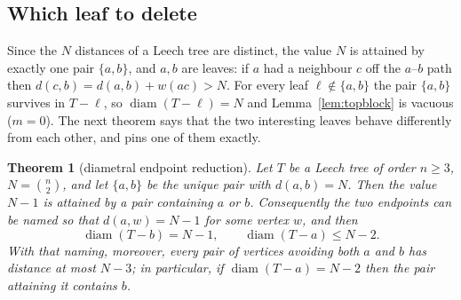 \documentclass[11pt,a4paper]{article}
\theoremstyle{plain}
\newtheorem{theorem}{Theorem}[section]
\theoremstyle{remark}
\newcommand{\bin}[2]{\binom{#1}{#2}}
\newcommand{\diam}{\operatorname{diam}}
\begin{document}
\subsection{Which leaf to delete}\label{sec:endpoint}

Since the $N$ distances of a Leech tree are distinct, the value $N$ is attained
by exactly one pair $\{a,b\}$, and $a,b$ are leaves: if $a$ had a neighbour $c$
off the $a$--$b$ path then $d(c,b)=d(a,b)+w(ac)>N$.  For every leaf
$\ell\notin\{a,b\}$ the pair $\{a,b\}$ survives in $T-\ell$, so
$\diam(T-\ell)=N$ and Lemma~\ref{lem:topblock} is vacuous ($m=0$).  The next
theorem says that the two interesting leaves behave differently from each other,
and pins one of them exactly.

\begin{theorem}[diametral endpoint reduction]\label{thm:endpoint}
Let $T$ be a Leech tree of order $n\ge3$, $N=\bin n2$, and let $\{a,b\}$ be the
unique pair with $d(a,b)=N$.  Then the value $N-1$ is attained by a pair
containing $a$ or $b$.  Consequently the two endpoints can be named so that
$d(a,w)=N-1$ for some vertex $w$, and then
\[
  \diam(T-b)=N-1,\qquad \diam(T-a)\le N-2 .
\]
With that naming, moreover, every pair of vertices avoiding both $a$ and $b$ has
distance at most $N-3$; in particular, if $\diam(T-a)=N-2$ then the pair
attaining it contains $b$.
\end{theorem}
\end{document}
